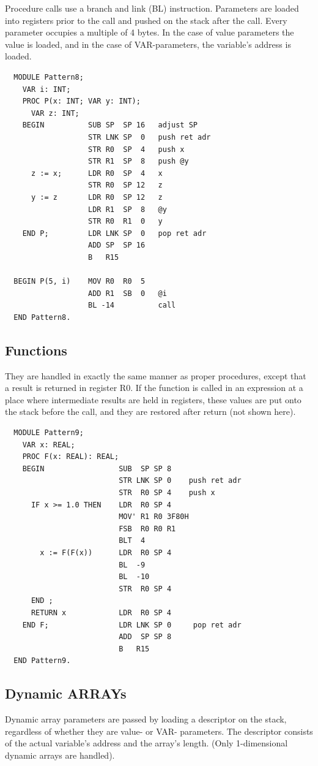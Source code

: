 Procedure calls use a branch and link (BL) instruction. Parameters are loaded into registers prior to
the call and pushed on the stack after the call. Every parameter occupies a multiple of 4 bytes. In
the case of value parameters the value is loaded, and in the case of VAR-parameters, the variable's
address is loaded.
\begin{verbatim}
  MODULE Pattern8;
    VAR i: INT;
    PROC P(x: INT; VAR y: INT);
      VAR z: INT;
    BEGIN          SUB SP  SP 16   adjust SP
                   STR LNK SP  0   push ret adr
                   STR R0  SP  4   push x
                   STR R1  SP  8   push @y
      z := x;      LDR R0  SP  4   x
                   STR R0  SP 12   z
      y := z       LDR R0  SP 12   z
                   LDR R1  SP  8   @y
                   STR R0  R1  0   y
    END P;         LDR LNK SP  0   pop ret adr
                   ADD SP  SP 16
                   B   R15

  BEGIN P(5, i)    MOV R0  R0  5
                   ADD R1  SB  0   @i
                   BL -14          call
  END Pattern8.
\end{verbatim}

\subsection{Functions}
They are handled in exactly the same manner as proper procedures, except that a result is returned
in register R0. If the function is called in an expression at a place where intermediate results
are held in registers, these values are put onto the stack before the call, and they are restored
after return (not shown here).
\begin{verbatim}
  MODULE Pattern9;
    VAR x: REAL;
    PROC F(x: REAL): REAL;
    BEGIN                 SUB  SP SP 8                   
                          STR LNK SP 0    push ret adr 
                          STR  R0 SP 4    push x
      IF x >= 1.0 THEN    LDR  R0 SP 4
                          MOV' R1 R0 3F80H
                          FSB  R0 R0 R1
                          BLT  4
        x := F(F(x))      LDR  R0 SP 4
                          BL  -9
                          BL  -10
                          STR  R0 SP 4
      END ;
      RETURN x            LDR  R0 SP 4
    END F;                LDR LNK SP 0     pop ret adr
                          ADD  SP SP 8
                          B   R15
  END Pattern9.
\end{verbatim}

\subsection{Dynamic ARRAYs}
Dynamic array parameters are passed by loading a descriptor on the stack, regardless of whether they
are value- or VAR- parameters. The descriptor consists of the actual variable's address and the array's
length. (Only 1-dimensional dynamic arrays are handled).

